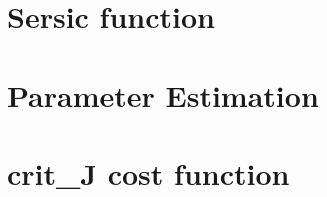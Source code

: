 \section{Sersic function}
\label{Appendix A}


\section{Parameter Estimation}
\label{Appendix B}


\section{crit\_J cost function}
\label{Appendix C}
